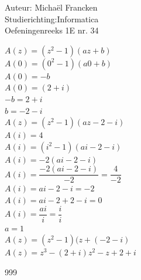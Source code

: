 \documentclass[a4paper]{article}
\begin{document}
\noindent \large Auteur: Michaël Francken\\
\noindent \large Studierichting:Informatica\\
\noindent \large Oefeningenreeks 1E nr. 34\\

\normalsize

$A(z)=(z^2-1)(az+b)$\\

$A(0)=(0^2-1)(a0+b)$\\

$A(0)= -b$\\

$A(0)=(2+i)$\\

$-b=2+i$\\

$b=-2-i$\\

$A(z)=(z^2-1)(az-2-i)$\\

$A(i)=4$\\

$A(i)=(i^2-1)(ai-2-i)$\\

$A(i)=-2(ai-2-i)$\\

$A(i)=\dfrac{-2(ai-2-i)}{-2} = \dfrac{4}{-2}$\\

$A(i)=ai-2-i=-2$\\

$A(i)=ai-2+2-i=0$\\

$A(i)= \dfrac{ai}{i}=\dfrac{i}{i}$\\

$a=1$\\

$A(z)=(z^2-1)(z+(-2-i)$\\

$A(z)=z^3-(2+i)z^2-z+2+i$\\

\begin{thebibliography}{999}
\end{thebibliography}
\end{document}
